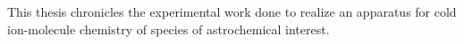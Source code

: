 This thesis chronicles the experimental work done to realize an apparatus for cold ion-molecule chemistry of species of astrochemical interest.
